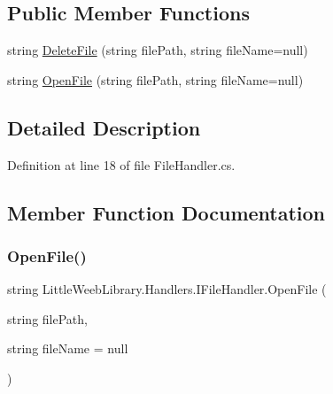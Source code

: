 \subsection*{Public Member Functions}
\begin{DoxyCompactItemize}
\item 
string \mbox{\hyperlink{interface_little_weeb_library_1_1_handlers_1_1_i_file_handler_aff6a35f857564900ae27586121a8bb41}{Delete\+File}} (string file\+Path, string file\+Name=null)
\item 
string \mbox{\hyperlink{interface_little_weeb_library_1_1_handlers_1_1_i_file_handler_a135124a2374dc64f5c64fdc4ff9eb049}{Open\+File}} (string file\+Path, string file\+Name=null)
\end{DoxyCompactItemize}


\subsection{Detailed Description}


Definition at line 18 of file File\+Handler.\+cs.



\subsection{Member Function Documentation}
\mbox{\label{interface_little_weeb_library_1_1_handlers_1_1_i_file_handler_a135124a2374dc64f5c64fdc4ff9eb049}} 
\subsubsection{\texorpdfstring{Open\+File()}{OpenFile()}}
{\footnotesize\ttfamily string Little\+Weeb\+Library.\+Handlers.\+I\+File\+Handler.\+Open\+File (\begin{DoxyParamCaption}\item[{string}]{file\+Path,  }\item[{string}]{file\+Name = {\ttfamily null} }\end{DoxyParamCaption})}



